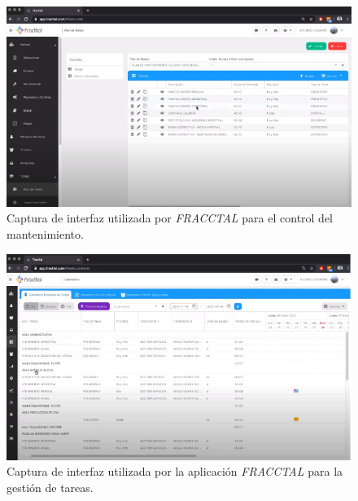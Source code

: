 \begin{figure}[H]
\centering
\includegraphics[scale=0.9]{images/fracctal2.png}
\caption{Captura de interfaz utilizada por \textit{FRACCTAL} para el control del mantenimiento.}
\label{fracctal2}
\end{figure}

\begin{figure}[H]
\centering
\includegraphics[scale=0.9]{images/fracctal3.png}
\caption{Captura de interfaz utilizada por la aplicación \textit{FRACCTAL} para la gestión de tareas.}
\label{fracctal3}
\end{figure}

